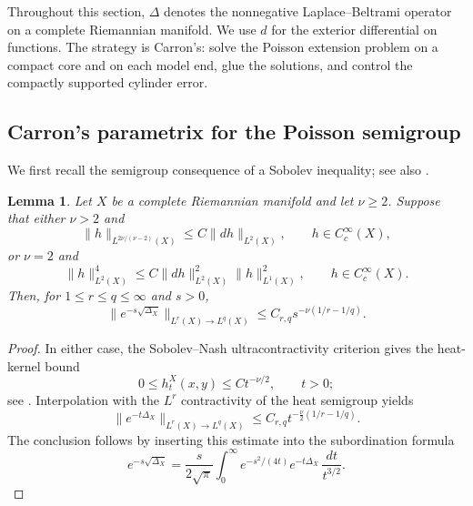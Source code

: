 \documentclass[12pt]{amsart}
\newcommand{\norm}[2]{\left\lVert #1\right\rVert_{#2}}
\newtheorem{lemma}[theorem]{Lemma}
\theoremstyle{remark}
\begin{document}
Throughout this section, $\Delta$ denotes the nonnegative Laplace--Beltrami
operator on a complete Riemannian manifold.  We use $d$ for the exterior
differential on functions.  The strategy is Carron's: solve the Poisson
extension problem on a compact core and on each model end, glue the solutions,
and control the compactly supported cylinder error.

\subsection{Carron's parametrix for the Poisson semigroup}

We first recall the semigroup consequence of a Sobolev inequality; see also \cite[Lemma~2.3]{Carron07}.


\begin{lemma}\label{lem:connected-poisson-smoothing}
Let $X$ be a complete Riemannian manifold and let $\nu\geq2$.
Suppose that either $\nu>2$ and
\[
 \|h\|_{L^{2\nu/(\nu-2)}(X)}
 \leq C\|dh\|_{L^2(X)},
 \qquad h\in C_c^\infty(X),
\]
or $\nu=2$ and
\[
 \|h\|_{L^2(X)}^4
 \leq C\|dh\|_{L^2(X)}^2\|h\|_{L^1(X)}^2,
 \qquad h\in C_c^\infty(X).
\]
Then, for $1\leq r\leq q\leq\infty$ and $s>0$,
\[
 \bigl\|e^{-s\sqrt{\Delta_X}}\bigr\|_{L^r(X)\to L^q(X)}
 \leq C_{r,q}s^{-\nu(1/r-1/q)}.
\]
\end{lemma}


\begin{proof}
In either case, the Sobolev--Nash ultracontractivity criterion gives
the heat-kernel bound
\[
 0\leq h_t^X(x,y)\leq Ct^{-\nu/2},
 \qquad t>0;
\]
see \cite{VaropoulosSaloffCosteCoulhon92}.
Interpolation with the $L^r$ contractivity of the heat semigroup yields
\[
 \|e^{-t\Delta_X}\|_{L^r(X)\to L^q(X)}
 \leq C_{r,q}t^{-\frac{\nu}{2}(1/r-1/q)}.
\]
The conclusion follows by inserting this estimate into the
subordination formula
\[
 e^{-s\sqrt{\Delta_X}}
 =\frac{s}{2\sqrt{\pi}}
   \int_0^\infty
   e^{-s^2/(4t)}e^{-t\Delta_X}\,\frac{dt}{t^{3/2}}.
\]
\end{proof}



\end{document}
